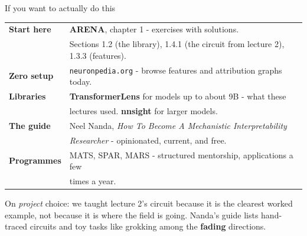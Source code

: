 \documentclass[aspectratio=169]{beamer}
\newcommand{\watchbox}[1]{%
  \begin{tcolorbox}[colback=armorange!12, colframe=armorange, boxrule=0.6pt, arc=2pt]
  #1
  \end{tcolorbox}}
\begin{document}
\begin{frame}{If you want to actually do this}
  \vspace{0.5em}
  \begin{center}
  \small
  \begin{tabular}{@{}ll@{}}
    \toprule
    \textbf{Start here} & \textbf{ARENA}, chapter 1 - exercises with solutions.\\
      & Sections 1.2 (the library), 1.4.1 (the circuit from lecture 2), 1.3.3 (features).\\[0.5em]
    \textbf{Zero setup} & \texttt{neuronpedia.org} - browse features and attribution graphs today.\\[0.5em]
    \textbf{Libraries} & \textbf{TransformerLens} for models up to about 9B - what these\\
      & lectures used. \textbf{nnsight} for larger models.\\[0.5em]
    \textbf{The guide} & Neel Nanda, \emph{How To Become A Mechanistic Interpretability}\\
      & \emph{Researcher} - opinionated, current, and free.\\[0.5em]
    \textbf{Programmes} & MATS, SPAR, MARS - structured mentorship, applications a few\\
      & times a year.\\
    \bottomrule
  \end{tabular}
  \end{center}

  \vspace{0.3em}
  \watchbox{\small On \emph{project} choice: we taught lecture 2's circuit because it is the
  clearest worked example, not because it is where the field is going. Nanda's guide lists
  hand-traced circuits and toy tasks like grokking among the \textbf{fading} directions.}
\end{frame}
\end{document}
